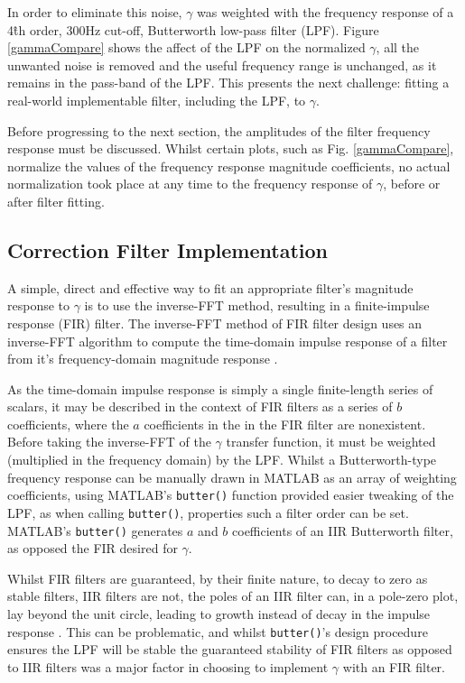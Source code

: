 \documentclass{report}
\begin{document}
            In order to eliminate this noise, $\gamma$ was weighted with the frequency response of a 4\^{th} order, 300Hz cut-off, Butterworth low-pass filter (LPF).
            Figure \ref{gammaCompare} shows the affect of the LPF on the normalized $\gamma$, all the unwanted noise is removed and the useful frequency range is unchanged, as it remains in the pass-band of the LPF.
            This presents the next challenge: fitting a real-world implementable filter, including the LPF, to $\gamma$.

            Before progressing to the next section, the amplitudes of the filter frequency response must be discussed.
            Whilst certain plots, such as Fig. \ref{gammaCompare}, normalize the values of the frequency response magnitude coefficients, no actual normalization took place at any time to the frequency response of $\gamma$, before or after filter fitting.

        \subsection{Correction Filter Implementation}
            A simple, direct and effective way to fit an appropriate filter's magnitude response to $\gamma$ is to use the inverse-FFT method, resulting in a finite-impulse response (FIR) filter.
            The inverse-FFT method of FIR filter design uses an inverse-FFT algorithm to compute the time-domain impulse response of a filter from it's frequency-domain magnitude response \cite{li2019digital}.
            
            As the time-domain impulse response is simply a single finite-length series of scalars, it may be described in the context of FIR filters as a series of $b$ coefficients, where the $a$ coefficients in the in the FIR filter are nonexistent.
            Before taking the inverse-FFT of the $\gamma$ transfer function, it must be weighted (multiplied in the frequency domain) by the LPF.
            Whilst a Butterworth-type frequency response can be manually drawn in MATLAB as an array of weighting coefficients, using MATLAB's \texttt{butter()} function provided easier tweaking of the LPF, as when calling \texttt{butter()}, properties such a filter order can be set.
            MATLAB's \texttt{butter()} generates $a$ and $b$ coefficients of an IIR Butterworth filter, as opposed the FIR desired for $\gamma$.

            Whilst FIR filters are guaranteed, by their finite nature, to decay to zero as stable filters, IIR filters are not, the poles of an IIR filter can, in a pole-zero plot, lay beyond the unit circle, leading to growth instead of decay in the impulse response \cite{litwin2000fir}.
            This can be problematic, and whilst \texttt{butter()}'s design procedure ensures the LPF will be stable the guaranteed stability of FIR filters as opposed to IIR filters was a major factor in choosing to implement $\gamma$ with an FIR filter. 
\end{document}
